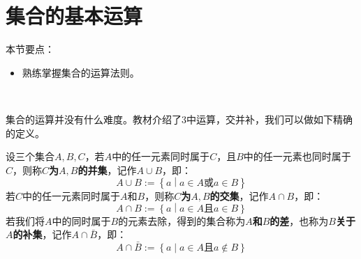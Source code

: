 \section{集合的基本运算}

本节要点：
\begin{itemize}
    \item 熟练掌握集合的运算法则。
\end{itemize}

~

集合的运算并没有什么难度。教材介绍了3中运算，交并补，我们可以做如下精确的定义。

\begin{definition}[集合的运算]
设三个集合$A,B,C$，若$A$中的任一元素同时属于$C$，且$B$中的任一元素也同时属于$C$，则称{\bf $C$为$A,B$的并集}，记作$A\cup B$，即：
\[
A\cup B:=\left\{ a \middle| a\in A\text{或}a\in B \right\}
\]
若$C$中的任一元素同时属于$A$和$B$，则称{\bf $C$为$A,B$的交集}，记作$A\cap B$，即：
\[
A\cap B:=\left\{ a \middle| a\in A\text{且}a\in B \right\}
\]
若我们将$A$中的同时属于$B$的元素去除，得到的集合称为{\bf $A$和$B$的差}，也称为{\bf $B$关于$A$的补集}，记作$A\cap \bar{B}$，即：
\[
A\cap \bar{B}:=\left\{ a \middle| a\in A\text{且}a\notin B \right\}
\]
\end{definition}

